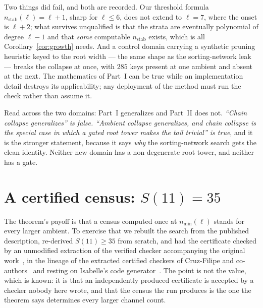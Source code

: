 \documentclass[11pt,a4paper]{article}
\theoremstyle{plain}
\theoremstyle{definition}
\theoremstyle{remark}
\newcommand{\nmin}{n_{\min}}
\newcommand{\nstab}{n_{\mathrm{stab}}}
\begin{document}
Two things did fail, and both are recorded. Our threshold formula
$\nstab(\ell) = \ell+1$, sharp for $\ell \le 6$, does not extend to $\ell = 7$,
where the onset is $\ell+2$; what survives unqualified is that the strata are
eventually polynomial of degree $\ell-1$ and that \emph{some} computable
$\nstab$ exists, which is all Corollary~\ref{cor:growth} needs. And a control
domain carrying a synthetic pruning heuristic keyed to the root width --- the
same shape as the sorting-network leak --- breaks the collapse at once, with
$285$ keys present at one ambient and absent at the next. The mathematics of
Part~I can be true while an implementation detail destroys its applicability;
any deployment of the method must run the check rather than assume it.

Read across the two domains: Part~I generalizes and Part~II does not.
\emph{``Chain collapse generalizes'' is false. ``Ambient collapse generalizes,
and chain collapse is the special case in which a gated root tower makes the
tail trivial'' is true}, and it is the stronger statement, because it says
\emph{why} the sorting-network search gets the clean identity. Neither new
domain has a non-degenerate root tower, and neither has a gate.

\section{A certified census: \texorpdfstring{$S(11)=35$}{S(11)=35}}\label{sec:s11}

The theorem's payoff is that a census computed once at $\nmin(\ell)$ stands for
every larger ambient. To exercise that we rebuilt the search from the published
description, re-derived $S(11) \ge 35$ from scratch, and had the certificate
checked by an unmodified extraction of the verified checker accompanying the
original work~\cite{Harder20}, in the lineage of the extracted certified
checkers of Cruz-Filipe and co-authors~\cite{CS15,CLS17} and resting on
Isabelle's code generator~\cite{HN10}. The point is not the value, which is
known: it is that an independently produced certificate is accepted by a
checker nobody here wrote, and that the census the run produces is the one the
theorem says determines every larger channel count.
\end{document}
